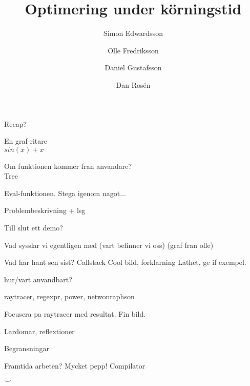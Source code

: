 \documentclass{beamer}
\begin{document}
\title{Optimering under körningstid}


\author{Simon Edwardsson \and Olle Fredriksson
\and \linebreak{}
Daniel Gustafsson \and Dan Rosén}



\begin{frame}
    \titlepage
\end{frame}

\begin{frame}

	Recap?

\end{frame}

\begin{frame}


	En graf-ritare\\
	\pause
	$sin(x) + x$
	
	Om funktionen kommer fran anvandare?\\
	\pause
	Tree

	\pause
	Eval-funktionen.
	Stega igenom nagot...
	
	\pause
	Problembeskrivning + lsg

	\pause
	Till slut ett demo?

\end{frame}

\begin{frame}

	Vad sysslar vi egentligen med (vart befinner vi oss) (graf fran olle)

\end{frame}

\begin{frame}
	Vad har hant sen sist?
	\pause
	Callstack
		Cool bild, forklarning
	\pause 
	Lathet, ge if exempel.
\end{frame}

\begin{frame}
	hur/vart anvandbart?
	
	raytracer, regexpr, power, netwonraphson
\end{frame}

\begin{frame}
	Focusera pa raytracer med resultat.
	Fin bild.
\end{frame}

\begin{frame}

	Lardomar, reflextioner

\end{frame}

\begin{frame}
	Begransningar 
	
\end{frame} 

\begin{frame}
	Framtida arbeten?
	Mycket pepp!
	Compilator
	
	$\ddot\smile$ 
\end{frame}
\end{document}
